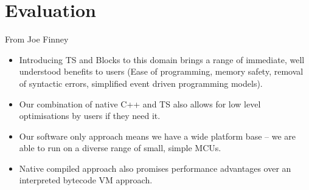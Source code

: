 \section{Evaluation}
\label{sec:evaluate}

From Joe Finney

\begin{itemize}
\item Introducing TS and Blocks to this domain brings a range of immediate, 
    well understood benefits to users (Ease of programming, memory safety, 
    removal of syntactic errors, simplified event driven programming models). 
\item Our combination of native C++ and TS also allows for low level optimisations 
      by users if they need it.
\item Our software only approach means we have a wide platform base – 
     we are able to run on a diverse range of small, simple MCUs.
\item Native compiled approach also promises performance advantages over 
      an interpreted bytecode VM approach.
\end{itemize}

